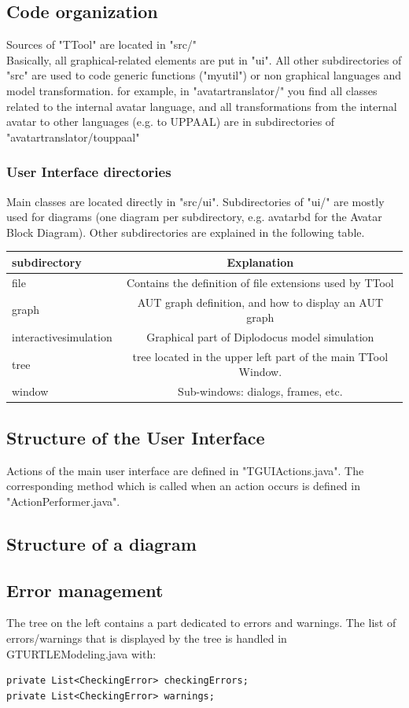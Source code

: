 \documentclass[12pt]{article}
\begin{document}
\subsection{Code organization}
Sources of "TTool" are located in "src/"\\
Basically, all graphical-related elements are put in "ui". All other subdirectories of "src" are used to code generic functions ("myutil") or non graphical languages and model transformation. for example, in "avatartranslator/" you find all classes related to the internal avatar language, and all transformations from the internal avatar to other languages (e.g. to UPPAAL) are in subdirectories of "avatartranslator/touppaal"
\subsubsection{User Interface directories}
Main classes are located directly in "src/ui". Subdirectories of "ui/" are mostly used for diagrams (one diagram per subdirectory, e.g. avatarbd for the Avatar Block Diagram). Other subdirectories are explained in the following table.
\begin{tabular}{l|c}
subdirectory&Explanation\\
\hline
file&Contains the definition of file extensions used by TTool\\
graph&AUT graph definition, and how to display an AUT graph\\
interactivesimulation&Graphical part of Diplodocus model simulation\\
tree&tree located in the upper left part of the main TTool Window.\\
window&Sub-windows: dialogs, frames, etc.
\end{tabular}

\subsection{Structure of the User Interface}
Actions of the main user interface are defined in "TGUIActions.java". The corresponding method which is called when an action occurs is defined in "ActionPerformer.java".

\subsection{Structure of a diagram}


\subsection{Error management}
The tree on the left contains a part dedicated to errors and warnings. The list of errors/warnings that is displayed by the tree is handled in GTURTLEModeling.java with:
\begin{lstlisting}
private List<CheckingError> checkingErrors;
private List<CheckingError> warnings;
\end{lstlisting}
\end{document}
